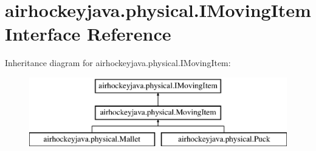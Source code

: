 \hypertarget{interfaceairhockeyjava_1_1physical_1_1_i_moving_item}{}\section{airhockeyjava.\+physical.\+I\+Moving\+Item Interface Reference}
\label{interfaceairhockeyjava_1_1physical_1_1_i_moving_item}
Inheritance diagram for airhockeyjava.\+physical.\+I\+Moving\+Item\+:\begin{figure}[H]
\begin{center}
\leavevmode
\includegraphics[height=3.000000cm]{interfaceairhockeyjava_1_1physical_1_1_i_moving_item}
\end{center}
\end{figure}
